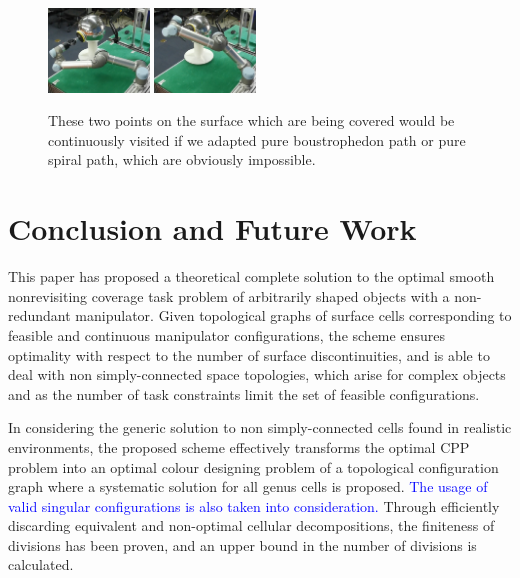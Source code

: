 \documentclass[Afour,sageh,times]{sagej}
\begin{document}
\begin{figure}[t]
\centering
\includegraphics[width = 0.24\textwidth]{figures/real_world/show_demo_of_two_colours/demo_2}
\includegraphics[width = 0.24\textwidth]{figures/real_world/show_demo_of_two_colours/demo_3}
\caption{These two points on the surface which are being covered would be continuously visited if we adapted pure boustrophedon path or pure spiral path, which are obviously impossible. }\label{fig:two_points}
\end{figure}



\section{Conclusion and Future Work}\label{section_conclusion}
This paper has proposed a theoretical complete solution to the optimal smooth nonrevisiting coverage task problem of arbitrarily shaped objects with a non-redundant manipulator. 
Given topological graphs of surface cells corresponding to feasible and continuous manipulator configurations, 
the scheme ensures optimality with respect to the number of surface discontinuities, and is able to deal with non simply-connected 
space topologies, which arise for complex objects and as the number of task constraints limit the set of feasible configurations. 

In considering the generic solution to non simply-connected cells found in realistic 
environments, the proposed scheme effectively transforms the optimal CPP problem into an optimal colour designing problem of a topological configuration graph where a systematic solution for all genus cells is proposed. 
\textcolor{blue}{The usage of valid singular configurations is also taken into consideration. }
Through efficiently discarding equivalent and non-optimal cellular decompositions, the finiteness of divisions has been proven, and an upper bound in the number of divisions is calculated. 
\end{document}
